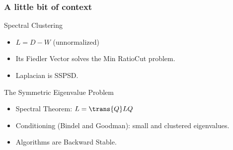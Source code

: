 \begin{frame}
  \frametitle{A little bit of context}
  \begin{block}{Spectral Clustering}
    \begin{itemize}
    \item $L = D - W$ (unnormalized)
    \item Its Fiedler Vector solves the Min RatioCut problem.
    \item Laplacian is SSPSD.
    \end{itemize}
  \end{block}
  \begin{block}{The Symmetric Eigenvalue Problem}
    \begin{itemize}
    \item Spectral Theorem: $L = \trans{Q}LQ$
    \item Conditioning (Bindel and Goodman): small and clustered eigenvalues.
    \item Algorithms are Backward Stable.
    \end{itemize}
  \end{block}  
\end{frame}
